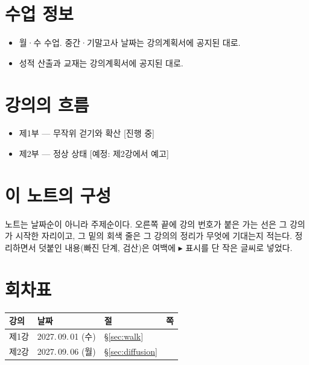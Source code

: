 \documentclass[11pt]{article}
\begin{document}
\makelecheader

\section*{수업 정보}
\begin{itemize}[leftmargin=1.2em,itemsep=1pt,topsep=3pt]
  \item 월·수 수업. 중간·기말고사 날짜는 강의계획서에 공지된 대로.
  \item 성적 산출과 교재는 강의계획서에 공지된 대로.
\end{itemize}

\section*{강의의 흐름}
\begin{itemize}[leftmargin=1.2em,itemsep=1pt,topsep=3pt]
  \item 제1부 --- 무작위 걷기와 확산 \hfill {\small[진행 중]}
  \item 제2부 --- 정상 상태 \hfill {\small[예정: 제2강에서 예고]}
\end{itemize}

\section*{이 노트의 구성}
노트는 날짜순이 아니라 주제순이다. 오른쪽 끝에 강의 번호가 붙은 가는 선은 그
강의가 시작한 자리이고, 그 밑의 회색 줄은 그 강의의 정리가 무엇에 기대는지
적는다. 정리하면서 덧붙인 내용(빠진 단계, 검산)은 여백에 $\blacktriangleright$
표시를 단 작은 글씨로 넣었다.

\section*{회차표}
{\small
\begin{longtable}{@{}l l l r@{}}
\toprule
강의 & 날짜 & 절 & 쪽\\
\midrule
\endhead
제1강 & 2027.\,09.\,01 (수) & \S\ref{sec:walk} & \pageref{lec:2027-09-01}\\
제2강 & 2027.\,09.\,06 (월) & \S\ref{sec:diffusion} & \pageref{lec:2027-09-06}\\
\bottomrule
\end{longtable}}

{\small\tableofcontents}

\end{document}
